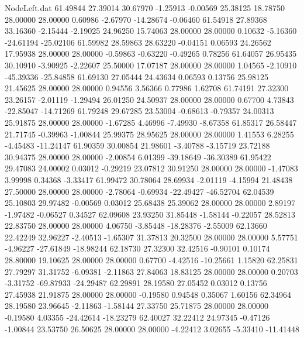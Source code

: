 \begin{filecontents}{NodeLeft.dat}
  61.49844   27.39014   30.67970    -1.25913   -0.00569   25.38125   18.78750   28.00000   28.00000    0.60986   -2.67970  -14.28674   -0.06460
  61.54918   27.89368   33.16360    -2.15444   -2.19025   24.96250   15.74063   28.00000   28.00000    0.10632   -5.16360  -24.61194  -25.02106
  61.59982   28.59863   28.63220    -0.04151    0.06593   24.26562   17.95938   28.00000   28.00000   -0.59863   -0.63220   -0.49265    0.78256
  61.64057   26.95435   30.10910    -3.90925   -2.22607   25.50000   17.07187   28.00000   28.00000    1.04565   -2.10910  -45.39336  -25.84858
  61.69130   27.05444   24.43634     0.06593    0.13756   25.98125   21.45625   28.00000   28.00000    0.94556    3.56366    0.77986    1.62708
  61.74191   27.32300   23.26157    -2.01119   -1.29494   26.01250   24.50937   28.00000   28.00000    0.67700    4.73843  -22.85047  -14.71269
  61.79248   29.67285   23.53004    -0.68613   -0.79357   24.00313   25.91875   28.00000   28.00000   -1.67285    4.46996   -7.49930   -8.67358
  61.85317   26.58447   21.71745    -0.39963   -1.00844   25.99375   28.95625   28.00000   28.00000    1.41553    6.28255   -4.45483  -11.24147
  61.90359   30.00854   21.98601    -3.40788   -3.15719   23.72188   30.94375   28.00000   28.00000   -2.00854    6.01399  -39.18649  -36.30389
  61.95422   29.47083   24.00002     0.03012   -0.29219   23.07812   30.91250   28.00000   28.00000   -1.47083    3.99998    0.34368   -3.33417
  61.99472   30.78064   28.69934    -2.01119   -4.15994   21.48438   27.50000   28.00000   28.00000   -2.78064   -0.69934  -22.49427  -46.52704
  62.04539   25.10803   29.97482    -0.00569    0.03012   25.68438   25.39062   28.00000   28.00000    2.89197   -1.97482   -0.06527    0.34527
  62.09608   23.93250   31.85448    -1.58144   -0.22057   28.52813   22.83750   28.00000   28.00000    4.06750   -3.85448  -18.28376   -2.55009
  62.13660   22.42249   32.96227    -2.40513   -1.65307   31.37813   20.32500   28.00000   28.00000    5.57751   -4.96227  -27.61849  -18.98244
  62.18730   27.32300   32.42516    -0.90101    0.10174   28.80000   19.10625   28.00000   28.00000    0.67700   -4.42516  -10.25661    1.15820
  62.25831   27.79297   31.31752    -6.09381   -2.11863   27.84063   18.83125   28.00000   28.00000    0.20703   -3.31752  -69.87933  -24.29487
  62.29891   28.19580   27.05452     0.03012    0.13756   27.45938   21.91875   28.00000   28.00000   -0.19580    0.94548    0.35067    1.60156
  62.34964   28.19580   23.96645    -2.11863   -1.58144   27.33750   25.71875   28.00000   28.00000   -0.19580    4.03355  -24.42614  -18.23279
  62.40027   32.22412   24.97345    -0.47126   -1.00844   23.53750   26.50625   28.00000   28.00000   -4.22412    3.02655   -5.33410  -11.41448

\end{filecontents}
